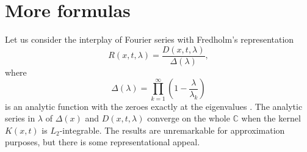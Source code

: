\documentclass{article}
\newcommand{\CC}{\mathbb{C}}
\begin{document}
\section{More formulas}

Let us consider the interplay of Fourier series with Fredholm's representation 
\begin{equation}
R(x,t,\lambda)=\frac{D(x,t,\lambda)}{\Delta(\lambda)},
\end{equation}
where 
\begin{equation} \label{eq:delta}
\Delta(\lambda)=\prod_{k=1}^{\infty} \left(1-\frac{\lambda}{\lambda_k}\right)
\end{equation}
is an analytic function with the zeroes exactly at the eigenvalues \cite[Ch.~4]{Kanwal}.
The analytic series in $\lambda$ of $\Delta(x)$ and $D(x,t,\lambda)$  converge on the whole $\CC$
when the kernel $K(x,t)$ is $L_2$-integrable.
The results are unremarkable for approximation purposes, but there is some representational appeal.
\end{document}
